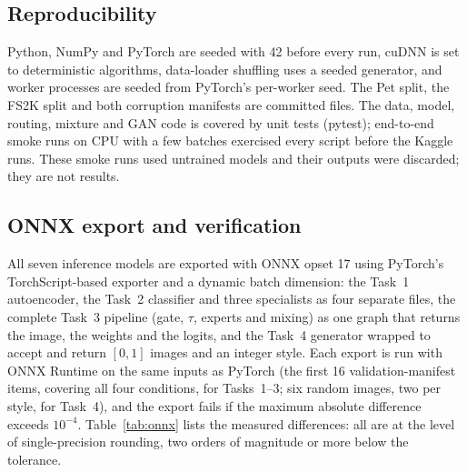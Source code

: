 \documentclass[conference]{IEEEtran}
\begin{document}
\subsection{Reproducibility}
Python, NumPy and PyTorch are seeded with 42 before every run, cuDNN is set
to deterministic algorithms, data-loader shuffling uses a seeded generator,
and worker processes are seeded from PyTorch's per-worker seed. The Pet
split, the FS2K split and both corruption manifests are committed files.
The data, model, routing, mixture and GAN code is covered by unit tests
(pytest); end-to-end smoke runs on CPU with a few batches exercised every
script before the Kaggle runs. These smoke runs used untrained models and
their outputs were discarded; they are not results.

\subsection{ONNX export and verification}
All seven inference models are exported with ONNX opset 17 using
PyTorch's TorchScript-based exporter and a dynamic batch dimension: the
Task~1 autoencoder, the Task~2 classifier and three specialists as four
separate files, the complete Task~3 pipeline (gate, $\tau$, experts and
mixing) as one graph that returns the image, the weights and the logits,
and the Task~4 generator wrapped to accept and return $[0,1]$ images and an
integer style. Each export is run with ONNX Runtime on the same inputs as
PyTorch (the first 16 validation-manifest items, covering all four
conditions, for Tasks~1--3; six random images, two per style, for Task~4),
and the export fails if the maximum absolute
difference exceeds $10^{-4}$. Table~\ref{tab:onnx} lists the measured
differences: all are at the level of single-precision rounding, two orders of
magnitude or more below the tolerance.
\end{document}
